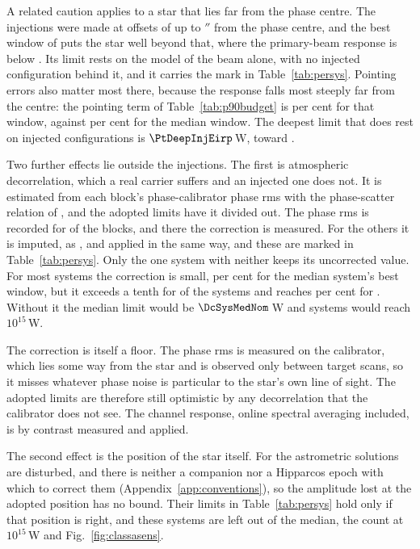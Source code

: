 A related caution applies to a star that lies far from the phase centre.
The injections were made at offsets of up to \OffInjMaxArcsec$''$ from the
phase centre, and the best window of \OffNames{} puts the star well beyond
that, where the primary-beam response is below \OffAcut. Its limit rests on
the model of the beam alone, with no injected configuration behind it, and
it carries the mark \OffMark{} in Table~\ref{tab:persys}. Pointing errors
also matter most there, because the response falls most steeply far from
the centre: the pointing term of Table~\ref{tab:p90budget} is
\PtUncDeepPct{} per cent for that window, against \PtUncMedPct{} per cent
for the median window. The deepest limit that does rest on injected
configurations is $\PtDeepInjEirp$\,W, toward \PtDeepInjStar.

Two further effects lie outside the injections. The first is atmospheric
decorrelation, which a real carrier suffers and an injected one does not.
It is estimated from each block's phase-calibrator phase rms
\citep[\S\S10.4.11, 11.3.1]{ALMAHandbook} with the phase-scatter relation of
\citet[Eq.~3]{Richards2022}, and the adopted limits have it divided out. The
phase rms is recorded for \SensDecorNBlk{} of the \SensDecorNBlkTot{}
blocks, and there the correction is measured. For the others it is
imputed, as \DcImputedRule, and applied in the same way, and these are
marked in Table~\ref{tab:persys}. Only the one system with neither keeps
its uncorrected value. For most systems the
correction is small, \NmDecSysMedPct{} per cent for the median system's
best window, but it exceeds a tenth for \NmDecNBigSys{} of the \NSysALimSum{} systems and reaches
\NmDecSysWorstPct{} per cent for \NmDecSysWorstName. Without it the median
limit would be $\DcSysMedNom$\,W and \DcNomNEfifteen{} systems
would reach $10^{15}$\,W.

The correction is itself a floor. The phase rms is measured on the
calibrator, which lies some way from the star and is observed only between
target scans, so it misses whatever phase noise is particular to the
star's own line of sight. The adopted limits are therefore still optimistic
by any decorrelation that the calibrator does not see. The channel response,
online spectral averaging included, is by contrast measured and applied.

The second effect is the position of the star itself. For \OmFlagStars{} the
astrometric solutions are disturbed, and there is neither a companion nor a
Hipparcos epoch with which to correct them
(Appendix~\ref{app:conventions}), so the amplitude lost at the adopted
position has no bound. Their limits in Table~\ref{tab:persys} hold only if
that position is right, and these \OmNFlagWord{} systems are left out of the
median, the count at $10^{15}$\,W and Fig.~\ref{fig:classasens}.

